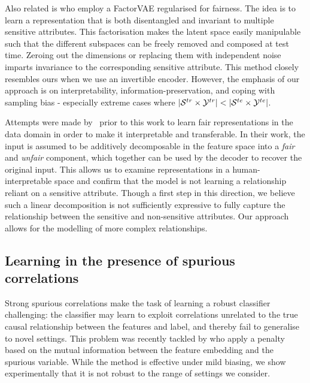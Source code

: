 Also related is \citet{creager2019flexibly} who employ a FactorVAE \citep{kim2018disentangling}
regularised for fairness. 
%
The idea is to learn a representation that is both disentangled and invariant to multiple sensitive
attributes. 
%
This factorisation makes the latent space easily manipulable such that the different subspaces can
be freely removed and composed at test time. Zeroing out the dimensions or replacing them with
independent noise imparts invariance to the corresponding sensitive attribute. 
%
This method closely resembles ours when we use an invertible encoder. 
%
However, the emphasis of our approach is on interpretability, information-preservation, and coping
with sampling bias - especially extreme cases where \( |{\mathcal{S}}^{tr} \times {\mathcal{Y}}^{tr}| < | {\mathcal{S}}^{te}
\times {\mathcal{Y}}^{te} | \).

Attempts were made by~\citet{QuaShaTho19} prior to this work to learn fair representations in the
data domain in order to make it interpretable and transferable. In their work, the input is assumed
to be additively decomposable in the feature space into a \emph{fair} and \emph{unfair} component,
which together can be used by the decoder to recover the original input. This allows us to examine
representations in a human-interpretable space and confirm that the model is not learning a
relationship reliant on a sensitive attribute. Though a first step in this direction, we believe
such a linear decomposition is not sufficiently expressive to fully capture the relationship
between the sensitive and non-sensitive attributes. Our approach allows for the modelling of more
complex relationships.

\subsection{Learning in the presence of spurious correlations}
Strong spurious correlations make the task of learning a robust classifier challenging: the
classifier may learn to exploit correlations unrelated to the true causal relationship between the
features and label, and thereby fail to generalise to novel settings. This problem was recently
tackled by \citet{kim2019learning} who apply a penalty based on the mutual information between the
feature embedding and the spurious variable. While the method is effective under mild biasing, we
show experimentally that it is not robust to the range of settings we consider.

